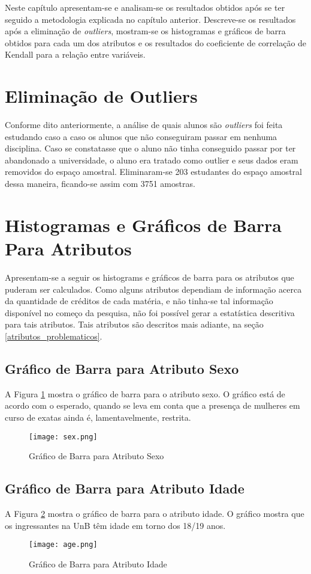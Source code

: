 Neste capítulo apresentam-se e analisam-se os resultados obtidos após se ter seguido a
metodologia explicada no capítulo anterior. Descreve-se os resultados após a
eliminação de \textit{outliers}, mostram-se os histogramas e gráficos de barra obtidos para
cada um dos atributos e os resultados do coeficiente de correlação de Kendall para a
relação entre variáveis. 

\section{Eliminação de Outliers}
Conforme dito anteriormente, a análise de quais alunos são \textit{outliers} foi feita
estudando caso a caso os alunos que não conseguiram passar em nenhuma disciplina.
Caso se constatasse que o aluno não tinha conseguido passar por ter abandonado a
universidade, o aluno era tratado como outlier e seus dados eram removidos do espaço
amostral. Eliminaram-se 203 estudantes do espaço amostral dessa maneira, ficando-se
assim com 3751 amostras. 

\section{Histogramas e Gráficos de Barra Para Atributos}
Apresentam-se a seguir os histograms e gráficos de barra para os atributos que puderam
ser calculados. Como alguns atributos dependiam de informação acerca da quantidade de
créditos de cada matéria, e não tinha-se tal informação disponível no começo da
pesquisa, não foi possível gerar a estatística descritiva para tais atributos. Tais
atributos são descritos mais adiante, na seção \ref{atributos_problematicos}.

\subsection{Gráfico de Barra para Atributo Sexo}
A Figura \ref{atr_sex} mostra o gráfico de barra para o atributo sexo. O gráfico
está de acordo com o esperado, quando se leva em conta que a presença de mulheres em
curso de exatas ainda é, lamentavelmente, restrita. 
\begin{figure}[!ht]
    \caption{Gráfico de Barra para Atributo Sexo}
    \centering
    \texttt{[image: sex.png]}
    \label{atr_sex}
\end{figure}

\subsection{Gráfico de Barra para Atributo Idade}
A Figura \ref{atr_age} mostra o gráfico de barra para o atributo idade. O gráfico
mostra que os ingressantes na UnB têm idade em torno dos 18/19 anos. 
\begin{figure}[!ht]
    \caption{Gráfico de Barra para Atributo Idade}
    \centering
    \texttt{[image: age.png]}
    \label{atr_age}
\end{figure}

